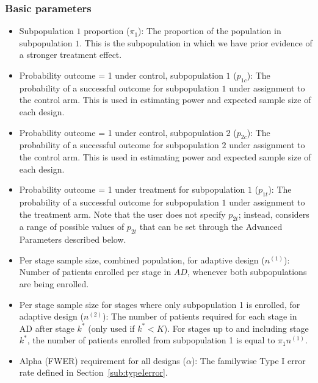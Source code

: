 \documentclass[article]{jss}
\begin{document}
\subsubsection{Basic parameters} 
\label{sub:basic-params}
\begin{itemize} 

\item Subpopulation $1$ proportion ($π_1$): The proportion of the population in subpopulation $1$. This is the subpopulation in which we have prior evidence of a stronger treatment effect. 

\item Probability outcome = 1 under control, subpopulation $1$ ($p_{1c}$): The probability of a successful outcome for subpopulation $1$ under assignment to the control arm. This is used in estimating power and expected sample size of each design.

\item Probability outcome = 1 under control, subpopulation $2$ ($p_{2c}$): The probability of a successful outcome  for subpopulation $2$ under assignment to the control arm. This is used in estimating power and expected sample size of each design.

\item Probability outcome = 1 under treatment for subpopulation $1$ ($p_{1t}$): The probability of a successful outcome for  subpopulation $1$ under assignment to the treatment arm. Note that the user does not specify $p_{2t}$; instead,  considers a range of possible values of $p_{2t}$ that can be set through the Advanced Parameters described below.

\item Per stage sample size, combined population, for adaptive design ($n^{(1)}$): Number of patients enrolled per stage in $AD$, whenever both subpopulations are being enrolled.

\item Per stage sample size for stages where only subpopulation 1 is enrolled, for adaptive design ($n^{(2)}$): The number of patients required for each stage in AD after stage $k^*$ (only used if $k^* < K$). For stages up to and including stage $k^*$, the number of patients enrolled from subpopulation 1 is equal to $\pi_1 n^{(1)}$.


\item Alpha (FWER) requirement for all designs ($α$): The familywise Type I error rate defined in Section~\ref{sub:typeIerror}. 


\end{itemize}
\end{document}
